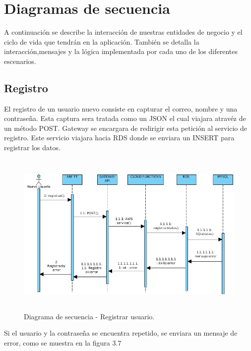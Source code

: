 \newpage
\section{Diagramas de secuencia}
A continuación se describe la interacción de nuestras entidades de negocio y el ciclo de vida que tendrán en la aplicación. También se detalla la interacción,mensajes y la lógica implementada por cada uno de los diferentes escenarios.\par
\subsection{Registro}
El registro de un usuario nuevo consiste en capturar el correo, nombre y una contraseña. Esta captura sera tratada como un JSON el cual viajara atravéz de un método POST. Gateway se encargara de redirigir esta petición al servicio de registro. Este servicio viajara hacia RDS donde se enviara un INSERT para registrar los datos. 
\vspace{5mm}
\begin{figure}[h!]
	\centering
	\includegraphics[width=14cm,height=8cm]{imagenes/analisis/DSregistrarUsuario.jpg}
	\caption{Diagrama de secuencia - Registrar usuario.}
	\label{fig:analogo}
\end{figure} 
\vspace{5mm}\par
Si el usuario y la contraseña se encuentra repetido, se enviara un mensaje de error, como se muestra en la figura 3.7
\newpage
